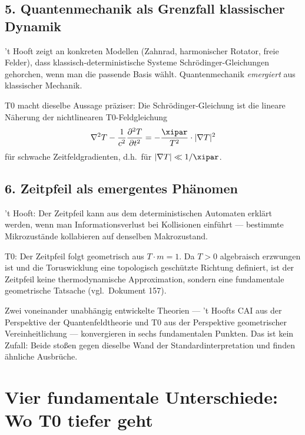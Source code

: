 \subsection{5. Quantenmechanik als Grenzfall klassischer Dynamik}

't Hooft zeigt an konkreten Modellen (Zahnrad, harmonischer Rotator, freie Felder),
dass klassisch-deterministische Systeme Schrödinger-Gleichungen gehorchen, wenn
man die passende Basis wählt. Quantenmechanik \emph{emergiert} aus klassischer
Mechanik.

T0 macht dieselbe Aussage präziser: Die Schrödinger-Gleichung ist die lineare
Näherung der nichtlinearen T0-Feldgleichung
\begin{equation}
    \nabla^2 T - \frac{1}{c^2}\frac{\partial^2 T}{\partial t^2}
    = -\frac{\xipar}{T^2} \cdot |\nabla T|^2
    \label{eq:t0_field_equation}
\end{equation}
für schwache Zeitfeldgradienten, d.h.\ für $|\nabla T| \ll 1/\xipar$.

\subsection{6. Zeitpfeil als emergentes Phänomen}

't Hooft: Der Zeitpfeil kann aus dem deterministischen Automaten erklärt werden,
wenn man Informationsverlust bei Kollisionen einführt — bestimmte Mikrozustände
kollabieren auf denselben Makrozustand.

T0: Der Zeitpfeil folgt geometrisch aus $T \cdot m = 1$. Da $T > 0$ algebraisch
erzwungen ist und die Toruswicklung eine topologisch geschützte Richtung definiert,
ist der Zeitpfeil keine thermodynamische Approximation, sondern eine fundamentale
geometrische Tatsache (vgl.\ Dokument 157).

\begin{discoveryBox}
    Zwei voneinander unabhängig entwickelte Theorien — 't Hoofts CAI aus der
    Perspektive der Quantenfeldtheorie und T0 aus der Perspektive geometrischer
    Vereinheitlichung — konvergieren in sechs fundamentalen Punkten. Das ist
    kein Zufall: Beide stoßen gegen dieselbe Wand der Standardinterpretation
    und finden ähnliche Ausbrüche.
\end{discoveryBox}

\clearpage

\section{Vier fundamentale Unterschiede: Wo T0 tiefer geht}
\label{sec:differences}

